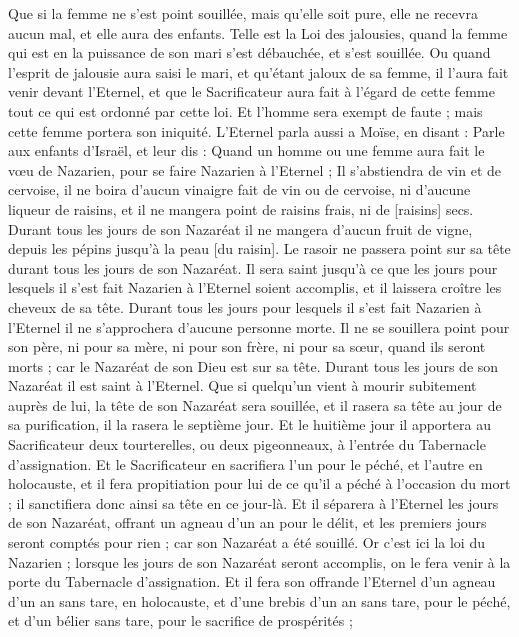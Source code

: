 \begin{multicols}{2}
Que si la femme ne s'est point souillée, mais qu'elle soit pure, elle ne recevra aucun mal, et elle aura des enfants.
Telle est la Loi des jalousies, quand la femme qui est en la puissance de son mari s'est débauchée, et s'est souillée.
Ou quand l'esprit de jalousie aura saisi le mari, et qu'étant jaloux de sa femme, il l'aura fait venir devant l'Eternel, et que le Sacrificateur aura fait à l'égard de cette femme tout ce qui est ordonné par cette loi.
Et l'homme sera exempt de faute ; mais cette femme portera son iniquité.
\VerseOne{}L'Eternel parla aussi a Moïse, en disant :
Parle aux enfants d'Israël, et leur dis : Quand un homme ou une femme aura fait le vœu de Nazarien, pour se faire Nazarien à l'Eternel ;
Il s'abstiendra de vin et de cervoise, il ne boira d'aucun vinaigre fait de vin ou de cervoise, ni d'aucune liqueur de raisins, et il ne mangera point de raisins frais, ni de [raisins] secs.
Durant tous les jours de son Nazaréat il ne mangera d'aucun fruit de vigne, depuis les pépins jusqu'à la peau [du raisin].
Le rasoir ne passera point sur sa tête durant tous les jours de son Nazaréat. Il sera saint jusqu'à ce que les jours pour lesquels il s'est fait Nazarien à l'Eternel soient accomplis, et il laissera croître les cheveux de sa tête.
Durant tous les jours pour lesquels il s'est fait Nazarien à l'Eternel il ne s'approchera d'aucune personne morte.
Il ne se souillera point pour son père, ni pour sa mère, ni pour son frère, ni pour sa sœur, quand ils seront morts ; car le Nazaréat de son Dieu est sur sa tête.
Durant tous les jours de son Nazaréat il est saint à l'Eternel.
Que si quelqu'un vient à mourir subitement auprès de lui, la tête de son Nazaréat sera souillée, et il rasera sa tête au jour de sa purification, il la rasera le septième jour.
Et le huitième jour il apportera au Sacrificateur deux tourterelles, ou deux pigeonneaux, à l'entrée du Tabernacle d'assignation.
Et le Sacrificateur en sacrifiera l'un pour le péché, et l'autre en holocauste, et il fera propitiation pour lui de ce qu'il a péché à l'occasion du mort ; il sanctifiera donc ainsi sa tête en ce jour-là.
Et il séparera à l'Eternel les jours de son Nazaréat, offrant un agneau d'un an pour le délit, et les premiers jours seront comptés pour rien ; car son Nazaréat a été souillé.
Or c'est ici la loi du Nazarien ; lorsque les jours de son Nazaréat seront accomplis, on le fera venir à la porte du Tabernacle d'assignation.
Et il fera son offrande l'Eternel d'un agneau d'un an sans tare, en holocauste, et d'une brebis d'un an sans tare, pour le péché, et d'un bélier sans tare, pour le sacrifice de prospérités ;

\end{multicols}
